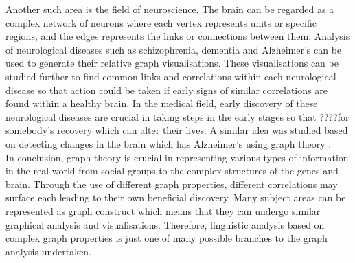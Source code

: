 Another such area is the field of neuroscience. The brain \cite{de2014graph} can be regarded as a complex network of neurons where each vertex represents units or specific regions, and the edges represents the links or connections between them. Analysis of neurological diseases such as schizophrenia, dementia and Alzheimer's can be used to generate their relative graph visualisations. These visualisations can be studied further to find common links and correlations within each neurological disease so that action could be taken if early signs of similar correlations are found within a healthy brain. In the medical field, early discovery of these neurological diseases are crucial in taking steps in the early stages so that ????for somebody's recovery which can alter their lives. A similar idea was studied based on detecting changes in the brain which has Alzheimer's using graph theory \cite{10.1093/braincomms/fcaa129}.\\


\noindent In conclusion, graph theory is crucial in representing various types of information in the real world from social groups to the complex structures of the genes and brain. Through the use of different graph properties, different correlations may surface each leading to their own beneficial discovery. Many subject areas can be represented as graph construct which means that they can undergo similar graphical analysis and visualisations. Therefore, linguistic analysis based on complex graph properties is just one of many possible branches to the graph analysis undertaken.